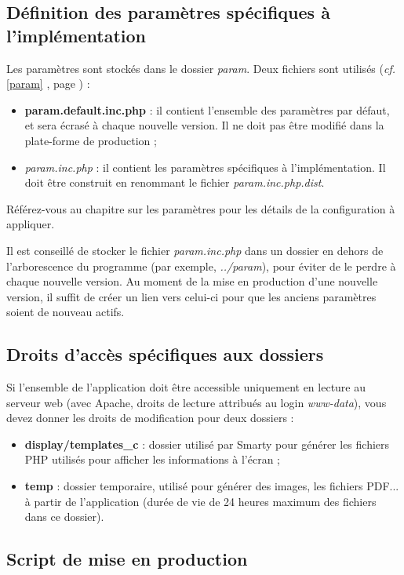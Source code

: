 \subsection{Définition des paramètres spécifiques à l'implémentation}

Les paramètres sont stockés dans le dossier \textit{param}. Deux fichiers sont utilisés (\textit{cf.} \ref{param} \textit{}, page \pageref{param}) :
\begin{itemize}
\item \textbf{param.default.inc.php} : il contient l'ensemble des paramètres par défaut, et sera écrasé à chaque nouvelle version. Il ne doit pas être modifié dans la plate-forme de production ;
\item \textit{param.inc.php} : il contient les paramètres spécifiques à l'implémentation. Il doit être construit en renommant le fichier \textit{param.inc.php.dist}.
\end{itemize}

Référez-vous au chapitre sur les paramètres pour les détails de la configuration à appliquer.

Il est conseillé de stocker le fichier \textit{param.inc.php} dans un dossier en dehors de l'arborescence du programme (par exemple, \textit{../param}), pour éviter de le perdre à chaque nouvelle version. 
Au moment de la mise en production d'une nouvelle version, il suffit de créer un lien vers celui-ci pour que les anciens paramètres soient de nouveau actifs.

\subsection{Droits d'accès spécifiques aux dossiers}
Si l'ensemble de l'application doit être accessible uniquement en lecture au serveur web (avec Apache, droits de lecture attribués au login \textit{www-data}), vous devez donner les droits de modification pour deux dossiers :
\begin{itemize}
\item \textbf{display/templates\_c} : dossier utilisé par Smarty pour générer les fichiers PHP utilisés pour afficher les informations à l'écran ;
\item \textbf{temp} : dossier temporaire, utilisé pour générer des images, les fichiers PDF... à partir de l'application (durée de vie de 24 heures maximum des fichiers dans ce dossier).
\end{itemize}

\subsection{Script de mise en production}

